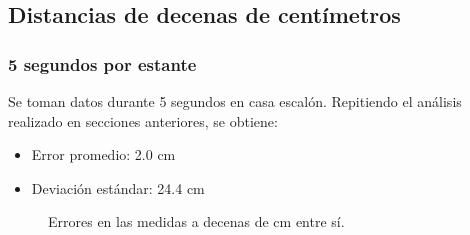 \documentclass[spanish,12pt,a4paper,titlepage]{report}
\begin{document}
\newpage
\subsection{Distancias de decenas de centímetros}

\subsubsection{5 segundos por estante}

Se toman datos durante 5 segundos en casa escalón. Repitiendo el análisis realizado en secciones anteriores, se obtiene:
\begin{itemize}
\item Error promedio: 2.0 cm
\item Deviación estándar: 24.4 cm
\end{itemize}

\begin{figure}[H]
\hspace{-50pt}
  \caption{Errores en las medidas a decenas de cm entre sí.}
\label{fig:cm-err}
\end{figure}
\end{document}
